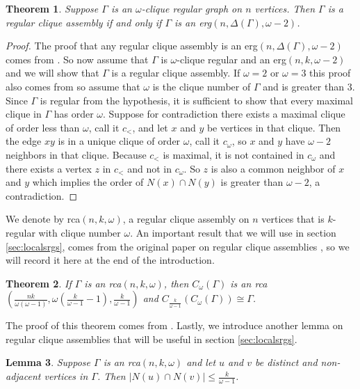 \documentclass[12pt]{report}
\newtheorem{thm}{Theorem}[chapter]
\newtheorem{lem}[thm]{Lemma}
\theoremstyle{definition}
\begin{document}
\begin{thm} \label{thm:rca1}
    Suppose $\Gamma$ is an $\omega$-clique regular graph on $n$ vertices. Then $\Gamma$ is a regular clique assembly if and only if $\Gamma$ is an \textnormal{erg}$(n,\Delta(\Gamma),\omega -2)$.
\end{thm}
\begin{proof}
    The proof that any regular clique assembly is an erg$(n,\Delta(\Gamma),\omega -2)$ comes from \cite[p. 304]{guest}. So now assume that $\Gamma$ is $\omega$-clique regular and an erg$(n,k,\omega-2)$ and we will show that $\Gamma$ is a regular clique assembly. If $\omega =2$ or $\omega=3$ this proof also comes from \cite[p. 304]{guest} so assume that $\omega$ is the clique number of $\Gamma$ and is greater than 3. Since $\Gamma$ is regular from the hypothesis, it is sufficient to show that every maximal clique in $\Gamma$ has order $\omega$. Suppose for contradiction there exists a maximal clique of order less than $\omega$, call it $c_<$, and let $x$ and  $y$ be vertices in that clique. Then the edge $xy$ is in a unique clique of order $\omega$, call it $c_\omega$, so $x$ and $y$ have $\omega -2$ neighbors in that clique. Because $c_<$ is maximal, it is not contained in $c_\omega$ and there exists a vertex $z$ in $c_<$ and not in $c_\omega$. So $z$ is also a common neighbor of $x$ and $y$ which implies the order of $N(x)\cap N(y)$ is greater than $\omega -2$, a contradiction.
\end{proof}
We denote by rca$(n,k,\omega)$, a regular clique assembly on $n$ vertices that is $k$-regular with clique number $\omega$. An important result that we will use in section \ref{sec:localsrgs}, comes from the original paper on regular clique assemblies \cite{guest}, so we will record it here at the end of the introduction.
\begin{thm}\label{thm:rca2}
    If $\Gamma$ is an \textnormal{rca}$(n,k,\omega)$, then $C_\omega(\Gamma)$ is an \textnormal{rca}$\left(\frac{nk}{\omega(\omega -1)}, \omega \left(\frac{k}{\omega -1}-1 \right), \frac{k}{\omega -1}\right)$ and $C_{\frac{k}{\omega -1}}(C_\omega(\Gamma))\cong\Gamma$.
\end{thm}
The proof of this theorem comes from \cite[Theorem 1]{guest}.
Lastly, we introduce another lemma on regular clique assemblies that will be useful in section \ref{sec:localsrgs}.
\begin{lem}\label{lem:nonadj}
    Suppose $\Gamma$ is an \textnormal{rca}$(n,k,\omega)$ and let $u$ and $v$ be distinct and non-adjacent vertices in $\Gamma$. Then $|N(u)\cap N(v)|\leq \frac{k}{\omega -1}$.
\end{lem}
\end{document}
